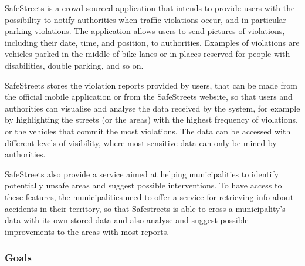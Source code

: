 SafeStreets is a crowd-sourced application that intends to provide users with the possibility to notify authorities when traffic violations occur, and in particular parking violations. The application allows users to send pictures of violations, including their date, time, and position, to authorities. Examples of violations are vehicles parked in the middle of bike lanes or in places reserved for people with disabilities, double parking, and so on.

SafeStreets stores the violation reports provided by users, that can be made from the official mobile application or from the SafeStreets website, so that users and authorities can visualise and analyse the data received by the system, for example by highlighting the streets (or the areas) with the highest frequency of violations, or the vehicles that commit the most violations. The data can be accessed with different levels of visibility, where most sensitive data can only be mined by authorities.

SafeStreets also provide a service aimed at helping municipalities to identify potentially unsafe areas and suggest possible interventions. To have access to these features, the municipalities need to offer a service for retrieving info about accidents in their territory, so that Safestreets is able to cross a municipality's data with its own stored data and also analyse and suggest possible improvements to the areas with most reports.
\subsubsection{Goals}
\begin{enumerate}[label={G\arabic*.}]
     \label{G_report_auth}
     \label{G_interventions}
     \label{G_inst_registration}
     \label{G_visualization}
    \begin{enumerate}[label={G\arabic{enumi}.\arabic*.}]
    	 \label{G_visualization_cit}
    	 \label{G_visualization_auth}
    \end{enumerate}
	 \label{G_accept_reports}
	 \label{G_check_info}
\end{enumerate}
